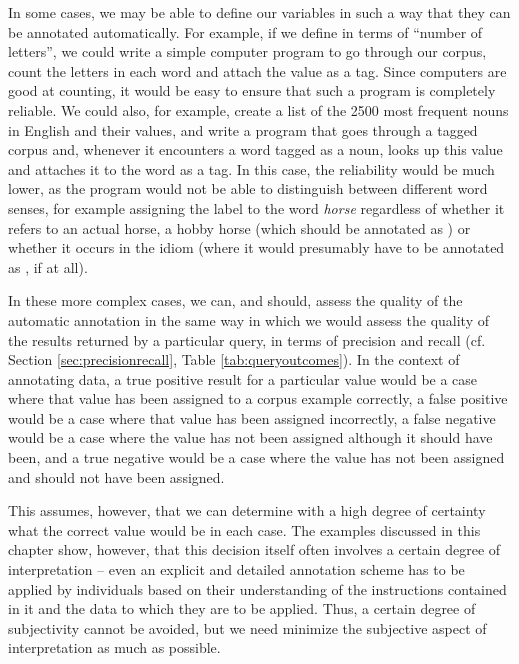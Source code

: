 In some cases, we may be able to define our variables in such a way that they can be annotated automatically. For example, if we define  in terms of ``number of letters'', we could write a simple computer program to go through our corpus, count the letters in each word and attach the value as a tag. Since computers are good at counting, it would be easy to ensure that such a program is completely reliable. We could also, for example, create a list of the 2500 most frequent nouns in English and their  values, and write a program that goes through a tagged corpus and, whenever it encounters a word tagged as a noun, looks up this value and attaches it to the word as a tag. In this case, the reliability would be much lower, as the program would not be able to distinguish between different word senses, for example assigning the label  to the word \textit{horse} regardless of whether it refers to an actual horse, a hobby horse (which should be annotated as ) or whether it occurs in the idiom  (where it would presumably have to be annotated as , if at all).

In these more complex cases, we can, and should, assess the quality of the automatic annotation in the same way in which we would assess the quality of the results returned by a particular query, in terms of precision and recall (cf. Section \ref{sec:precisionrecall}, Table \ref{tab:queryoutcomes}). In the context of annotating data, a true positive result for a particular value would be a case where that value has been assigned to a corpus example correctly, a false positive would be a case where that value has been assigned incorrectly, a false negative would be a case where the value has not been assigned although it should have been, and a true negative would be a case where the value has not been assigned and should not have been assigned.

This assumes, however, that we can determine with a high degree of certainty what the correct value would be in each case. The examples discussed in this chapter show, however, that this decision itself often involves a certain degree of interpretation -- even an explicit and detailed annotation scheme has to be applied by individuals based on their understanding of the instructions contained in it and the data to which they are to be applied. Thus, a certain degree of subjectivity cannot be avoided, but we need minimize the subjective aspect of interpretation as much as possible.

